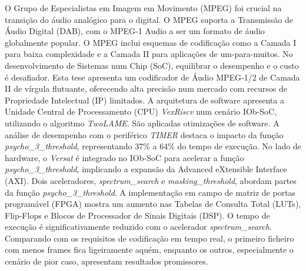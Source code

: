 O Grupo de Especialistas em Imagem em Movimento (MPEG) foi crucial na transição do áudio analógico para o digital. O MPEG suporta a Transmissão de Áudio Digital (DAB), com o MPEG-1 Audio a ser um formato de áudio globalmente popular. O MPEG inclui esquemas de codificação como a Camada I para baixa complexidade e a Camada II para aplicações de um-para-muitos.
No desenvolvimento de Sistemas num Chip (SoC), equilibrar o desempenho e o custo é desafiador. Esta tese apresenta um codificador de Áudio MPEG-1/2 de Camada II de vírgula flutuante, oferecendo alta precisão num mercado com recursos de Propriedade Intelectual (IP) limitados.
A arquitetura de software apresenta a Unidade Central de Processamento (CPU) \textit{VexRiscv} num cenário IOb-SoC, utilizando o algoritmo \textit{TwoLAME}. São aplicadas otimizações de software. A análise de desempenho com o periférico \textit{TIMER} destaca o impacto da função \textit{psycho\_3\_threshold}, representando 37\% a 64\% do tempo de execução.
No lado de hardware, o \textit{Versat} é integrado no IOb-SoC para acelerar a função \textit{psycho\_3\_threshold}, implicando a expansão da Advanced eXtensible Interface (AXI). Dois aceleradores, \textit{spectrum\_search} e \textit{masking\_threshold}, abordam partes da função \textit{psycho\_3\_threshold}. A implementação em campo de matriz de portas programável (FPGA) mostra um aumento nas Tabelas de Consulta Total (LUTs), Flip-Flops e Blocos de Processador de Sinais Digitais (DSP).
O tempo de execução é significativamente reduzido com o acelerador \textit{spectrum\_search}.
Comparando com os requisitos de codificação em tempo real, o primeiro ficheiro com menos frames fica ligeiramente aquém, enquanto os outros, especialmente o cenário de pior caso, apresentam resultados promissores.